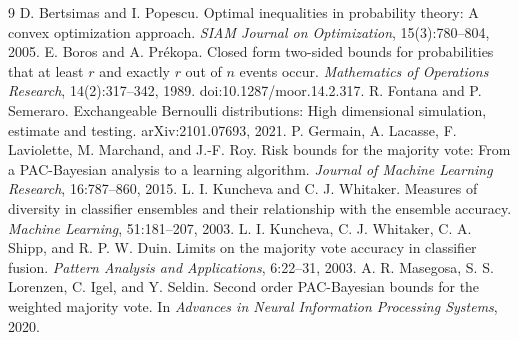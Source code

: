 \documentclass{article}
\begin{document}
\clearpage
\begin{thebibliography}{9}
D. Bertsimas and I. Popescu. Optimal inequalities in probability theory: A convex optimization approach. \emph{SIAM Journal on Optimization}, 15(3):780--804, 2005.
E. Boros and A. Pr\'ekopa. Closed form two-sided bounds for probabilities that at least $r$ and exactly $r$ out of $n$ events occur. \emph{Mathematics of Operations Research}, 14(2):317--342, 1989. doi:10.1287/moor.14.2.317.
R. Fontana and P. Semeraro. Exchangeable Bernoulli distributions: High dimensional simulation, estimate and testing. arXiv:2101.07693, 2021.
P. Germain, A. Lacasse, F. Laviolette, M. Marchand, and J.-F. Roy. Risk bounds for the majority vote: From a PAC-Bayesian analysis to a learning algorithm. \emph{Journal of Machine Learning Research}, 16:787--860, 2015.
L. I. Kuncheva and C. J. Whitaker. Measures of diversity in classifier ensembles and their relationship with the ensemble accuracy. \emph{Machine Learning}, 51:181--207, 2003.
L. I. Kuncheva, C. J. Whitaker, C. A. Shipp, and R. P. W. Duin. Limits on the majority vote accuracy in classifier fusion. \emph{Pattern Analysis and Applications}, 6:22--31, 2003.
A. R. Masegosa, S. S. Lorenzen, C. Igel, and Y. Seldin. Second order PAC-Bayesian bounds for the weighted majority vote. In \emph{Advances in Neural Information Processing Systems}, 2020.
\end{thebibliography}

\appendix
\end{document}
